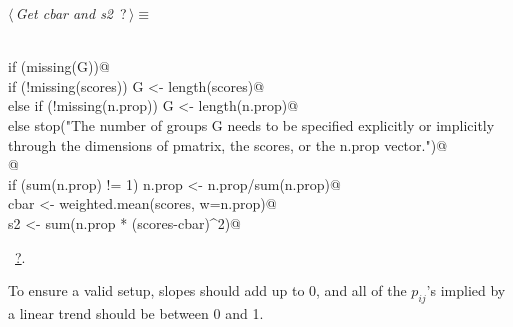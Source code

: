 \documentclass[reqno]{amsart}
\renewcommand{\NWtarget}[2]{\hypertarget{#1}{#2}}
\renewcommand{\NWlink}[2]{\hyperlink{#1}{#2}}
\begin{document}
\begin{flushleft} \small\label{scrap12}\raggedright\small
\NWtarget{nuweb?}{} $\langle\,${\itshape Get cbar and s2}\nobreak\ {\footnotesize {?}}$\,\rangle\equiv$
\vspace{-1ex}
\begin{list}{}{} \item
\mbox{}\verb@@\\
\mbox{}\verb@    if (missing(G)){@\\
\mbox{}\verb@      if (!missing(scores)) G <- length(scores)@\\
\mbox{}\verb@      else if (!missing(n.prop)) G <- length(n.prop)@\\
\mbox{}\verb@      else stop("The number of groups G needs to be specified explicitly or implicitly through the dimensions of pmatrix, the scores, or the n.prop vector.")@\\
\mbox{}\verb@    }@\\
\mbox{}\verb@    if (sum(n.prop) != 1) n.prop <- n.prop/sum(n.prop)@\\
\mbox{}\verb@    cbar <- weighted.mean(scores, w=n.prop)@\\
\mbox{}\verb@    s2 <- sum(n.prop * (scores-cbar)^2)@\\
\mbox{}\verb@@{\NWsep}
\end{list}
\vspace{-1.5ex}
\footnotesize
\begin{list}{}{\setlength{\itemsep}{-\parsep}\setlength{\itemindent}{-\leftmargin}}
\item \NWtxtMacroRefIn\ \NWlink{nuweb?}{?}.

\item{}
\end{list}
\vspace{4ex}
\end{flushleft}
To ensure a valid setup, slopes should add up to 0, and all of the $p_{ij}$'s implied by a linear trend should be between 0 and 1. 
\end{document}
